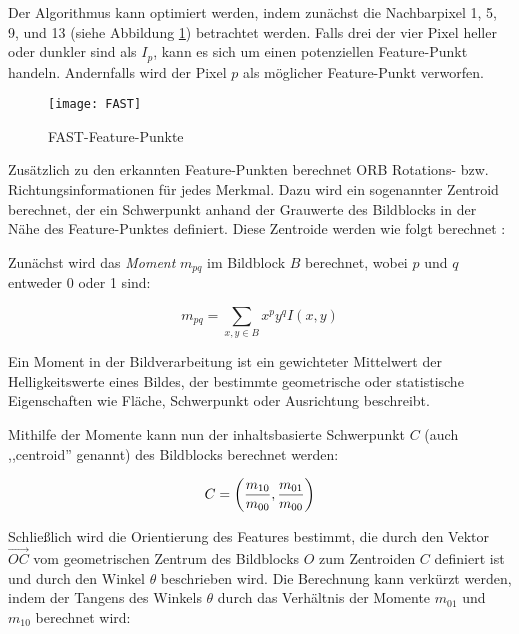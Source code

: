 Der Algorithmus kann optimiert werden, indem zunächst die Nachbarpixel 1, 5, 9, und 13 (siehe Abbildung \ref{fig:FAST}) betrachtet werden. Falls drei der vier Pixel heller oder dunkler sind als \( I_p \), kann es sich um einen potenziellen Feature-Punkt handeln. Andernfalls wird der Pixel \( p \) als möglicher Feature-Punkt verworfen. \cite{gao2021vSLAM, rublee2011orb, rosten2006fast}

\begin{figure}
    \centering
    \texttt{[image: FAST]}
    \caption{FAST-Feature-Punkte \cite{rosten2006fast}\label{fig:FAST}}\par
\end{figure}

Zusätzlich zu den erkannten Feature-Punkten berechnet ORB Rotations- bzw. Richtungsinformationen für jedes Merkmal. Dazu wird ein sogenannter Zentroid berechnet, der ein Schwerpunkt anhand der Grauwerte des Bildblocks in der Nähe des Feature-Punktes definiert. Diese Zentroide werden wie folgt berechnet \cite{gao2021vSLAM, rublee2011orb}:

Zunächst wird das \emph{Moment} \( m_{pq} \) im Bildblock \( B \) berechnet, wobei \( p \) und \( q \) entweder 0 oder 1 sind:

\begin{equation}
    m_{pq} = \sum_{x,y \in B} x^p y^q I(x, y)
\end{equation}

\begin{tcolorbox}[colback=THAi-Blue!20!white, colframe=THAi-Blue]
    Ein Moment in der Bildverarbeitung ist ein gewichteter Mittelwert der Helligkeitswerte eines Bildes, der bestimmte geometrische oder statistische Eigenschaften wie Fläche, Schwerpunkt oder Ausrichtung beschreibt. \cite{wikipedia2024moment}
\end{tcolorbox}

Mithilfe der Momente kann nun der inhaltsbasierte Schwerpunkt \( C \) (auch ,,centroid'' genannt) des Bildblocks berechnet werden:

\begin{equation}
C = 
\left(
\frac{m_{10}}{m_{00}}, \\
\frac{m_{01}}{m_{00}}
\right)
\end{equation}

Schließlich wird die Orientierung des Features bestimmt, die durch den Vektor \( \overrightarrow{OC} \) vom geometrischen Zentrum des Bildblocks \( O \) zum Zentroiden \( C \) definiert ist und durch den Winkel \( \theta \) beschrieben wird. Die Berechnung kann verkürzt werden, indem der Tangens des Winkels \( \theta \) durch das Verhältnis der Momente \( m_{01} \) und \( m_{10} \) berechnet wird:

